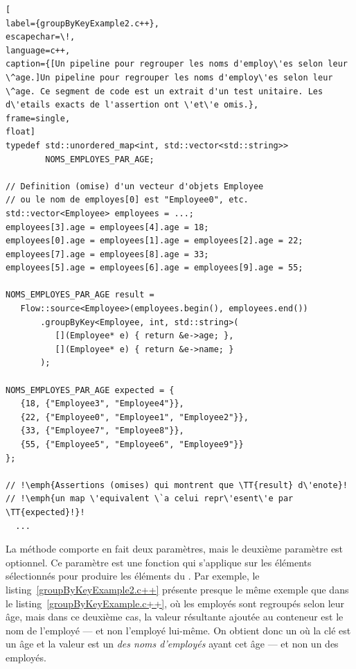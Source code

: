 \begin{lstlisting}[
label={groupByKeyExample2.c++},
escapechar=\!,
language=c++,
caption={[Un pipeline pour regrouper les noms d'employ\'es selon leur \^age.]Un pipeline pour regrouper les noms d'employ\'es selon leur \^age. Ce segment de code est un extrait d'un test unitaire. Les d\'etails exacts de l'assertion ont \'et\'e omis.},
frame=single,
float]
typedef std::unordered_map<int, std::vector<std::string>> 
        NOMS_EMPLOYES_PAR_AGE;

// Definition (omise) d'un vecteur d'objets Employee 
// ou le nom de employes[0] est "Employee0", etc.
std::vector<Employee> employees = ...; 
employees[3].age = employees[4].age = 18;
employees[0].age = employees[1].age = employees[2].age = 22;
employees[7].age = employees[8].age = 33;
employees[5].age = employees[6].age = employees[9].age = 55;

NOMS_EMPLOYES_PAR_AGE result = 
   Flow::source<Employee>(employees.begin(), employees.end())
       .groupByKey<Employee, int, std::string>(
          [](Employee* e) { return &e->age; },
          [](Employee* e) { return &e->name; }
       );
    
NOMS_EMPLOYES_PAR_AGE expected = {
   {18, {"Employee3", "Employee4"}},
   {22, {"Employee0", "Employee1", "Employee2"}},
   {33, {"Employee7", "Employee8"}},
   {55, {"Employee5", "Employee6", "Employee9"}}
};

// !\emph{Assertions (omises) qui montrent que \TT{result} d\'enote}!
// !\emph{un map \'equivalent \`a celui repr\'esent\'e par \TT{expected}!}!
  ...
\end{lstlisting}


La m\'ethode  comporte en fait deux param\`etres, mais le deuxi\`eme param\`etre est optionnel. Ce param\`etre est une fonction qui s'applique sur les \'el\'ements s\'electionn\'es pour produire les \'el\'ements du . Par exemple,  le listing~\ref{groupByKeyExample2.c++} pr\'esente presque le m\^eme exemple que dans le listing~\ref{groupByKeyExample.c++}, o\`u les employ\'es sont regroup\'es selon leur \^age, mais dans ce deuxi\`eme cas, la valeur r\'esultante ajout\'ee au conteneur est le nom de l'employ\'e --- et non l'employ\'e lui-m\^eme. On obtient donc un  o\`u la cl\'e est un \^age et la valeur est un  \emph{des noms d'employ\'es} ayant cet \^age --- et non un  des employ\'es.



